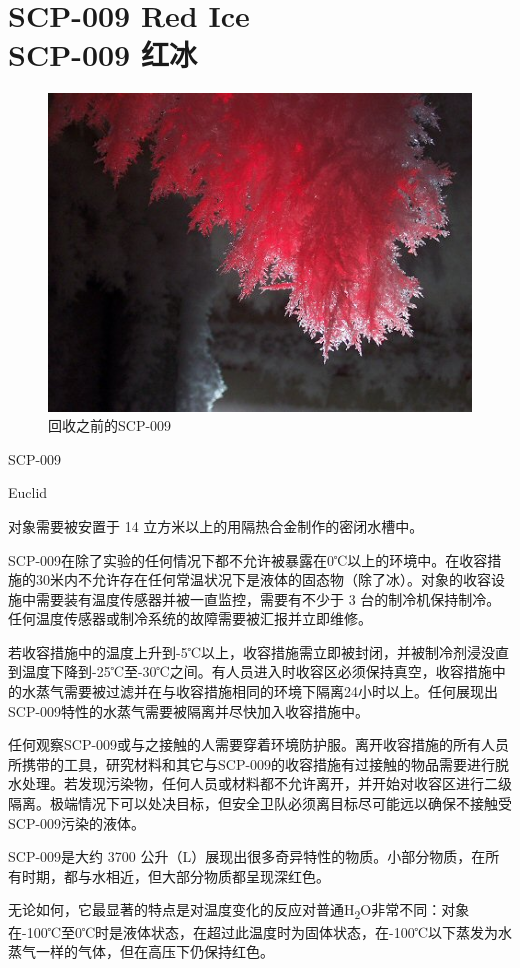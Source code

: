 \chapter[SCP-009 红冰]{
	SCP-009 Red Ice\\
	SCP-009 红冰
}

\label{chap:SCP-009}

\begin{figure}[H]
	\centering
	\includegraphics[width=0.5\linewidth]{images/SCP.009.jpg}
	\caption*{回收之前的SCP-009}
\end{figure}

SCP-009

Euclid

对象需要被安置于 14 立方米以上的用隔热合金制作的密闭水槽中。

SCP-009在除了实验的任何情况下都不允许被暴露在0℃以上的环境中。在收容措施的30米内不允许存在任何常温状况下是液体的固态物（除了冰）。对象的收容设施中需要装有温度传感器并被一直监控，需要有不少于 3 台的制冷机保持制冷。任何温度传感器或制冷系统的故障需要被汇报并立即维修。

若收容措施中的温度上升到-5℃以上，收容措施需立即被封闭，并被制冷剂浸没直到温度下降到-25℃至-30℃之间。有人员进入时收容区必须保持真空，收容措施中的水蒸气需要被过滤并在与收容措施相同的环境下隔离24小时以上。任何展现出SCP-009特性的水蒸气需要被隔离并尽快加入收容措施中。

任何观察SCP-009或与之接触的人需要穿着环境防护服。离开收容措施的所有人员所携带的工具，研究材料和其它与SCP-009的收容措施有过接触的物品需要进行脱水处理。若发现污染物，任何人员或材料都不允许离开，并开始对收容区进行二级隔离。极端情况下可以处决目标，但安全卫队必须离目标尽可能远以确保不接触受SCP-009污染的液体。

SCP-009是大约 3700 公升（L）展现出很多奇异特性的物质。小部分物质，在所有时期，都与水相近，但大部分物质都呈现深红色。

无论如何，它最显著的特点是对温度变化的反应对普通H\textsubscript{2}O非常不同：对象在-100℃至0℃时是液体状态，在超过此温度时为固体状态，在-100℃以下蒸发为水蒸气一样的气体，但在高压下仍保持红色。

